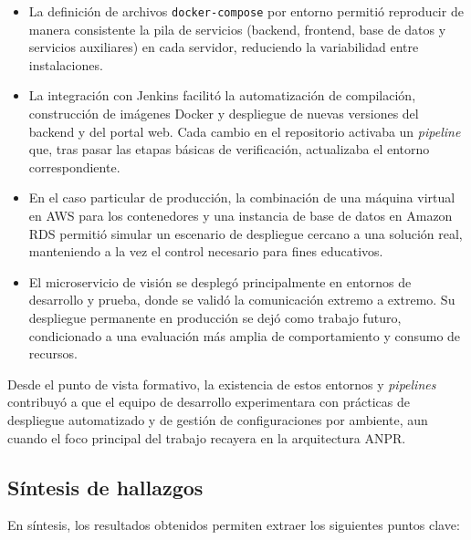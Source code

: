 \begin{itemize}
    \item La definición de archivos \texttt{docker-compose} por entorno permitió reproducir de manera consistente la pila de servicios (backend, frontend, base de datos y servicios auxiliares) en cada servidor, reduciendo la variabilidad entre instalaciones.
    \item La integración con Jenkins facilitó la automatización de compilación, construcción de imágenes Docker y despliegue de nuevas versiones del backend y del portal web. Cada cambio en el repositorio activaba un \textit{pipeline} que, tras pasar las etapas básicas de verificación, actualizaba el entorno correspondiente.
    \item En el caso particular de producción, la combinación de una máquina virtual en AWS para los contenedores y una instancia de base de datos en Amazon RDS permitió simular un escenario de despliegue cercano a una solución real, manteniendo a la vez el control necesario para fines educativos.
    \item El microservicio de visión se desplegó principalmente en entornos de desarrollo y prueba, donde se validó la comunicación extremo a extremo. Su despliegue permanente en producción se dejó como trabajo futuro, condicionado a una evaluación más amplia de comportamiento y consumo de recursos.
\end{itemize}

Desde el punto de vista formativo, la existencia de estos entornos y \textit{pipelines} contribuyó a que el equipo de desarrollo experimentara con prácticas de despliegue automatizado y de gestión de configuraciones por ambiente, aun cuando el foco principal del trabajo recayera en la arquitectura ANPR.

\subsection{Síntesis de hallazgos}

En síntesis, los resultados obtenidos permiten extraer los siguientes puntos clave:

